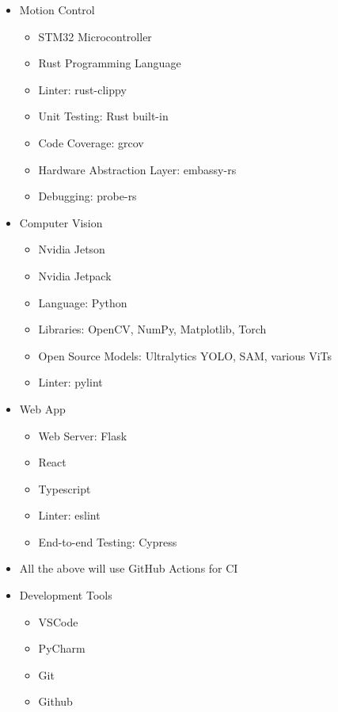 \documentclass{article}
\begin{document}
\begin{itemize}
  \item Motion Control
        \begin{itemize}
          \item STM32 Microcontroller
          \item Rust Programming Language
          \item Linter: rust-clippy
          \item Unit Testing: Rust built-in
          \item Code Coverage: grcov
          \item Hardware Abstraction Layer: embassy-rs
          \item Debugging: probe-rs
        \end{itemize}
  \item Computer Vision
        \begin{itemize}
          \item Nvidia Jetson
          \item Nvidia Jetpack
          \item Language: Python
          \item Libraries: OpenCV, NumPy, Matplotlib, Torch
          \item Open Source Models: Ultralytics YOLO, SAM, various ViTs
          \item Linter: pylint
        \end{itemize}
  \item Web App
        \begin{itemize}
          \item Web Server: Flask
          \item React
          \item Typescript
          \item Linter: eslint
          \item End-to-end Testing: Cypress
        \end{itemize}
  \item All the above will use GitHub Actions for CI
  \item Development Tools
        \begin{itemize}
          \item VSCode
          \item PyCharm
          \item Git
          \item Github
        \end{itemize}
\end{itemize}
\end{document}
